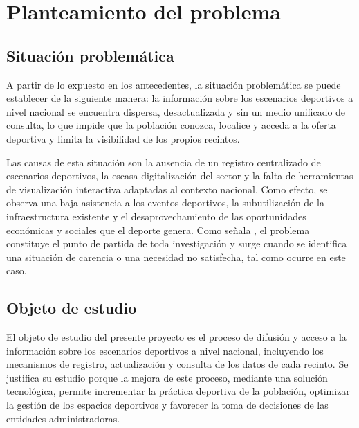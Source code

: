 
\section{Planteamiento del problema}

\subsection{Situaci\'on problem\'atica}

A partir de lo expuesto en los antecedentes, la situaci\'on
problem\'atica se puede establecer de la siguiente manera: la informaci\'on
sobre los escenarios deportivos a nivel nacional se encuentra dispersa,
desactualizada y sin un medio unificado de consulta, lo que impide que la
poblaci\'on conozca, localice y acceda a la oferta deportiva y limita la
visibilidad de los propios recintos.

Las causas de esta situaci\'on son la ausencia de un registro centralizado de
escenarios deportivos, la escasa digitalizaci\'on del sector y la falta de
herramientas de visualizaci\'on interactiva adaptadas al contexto nacional.
Como efecto, se observa una baja asistencia a los eventos deportivos, la
subutilizaci\'on de la infraestructura existente y el desaprovechamiento de
las oportunidades econ\'omicas y sociales que el deporte genera. Como se\~nala
\citet{arias2012}, el problema constituye el punto de partida de toda
investigaci\'on y surge cuando se identifica una situaci\'on de carencia o una
necesidad no satisfecha, tal como ocurre en este caso.

\subsection{Objeto de estudio}

El objeto de estudio del presente proyecto es el proceso de difusi\'on
y acceso a la informaci\'on sobre los escenarios deportivos a nivel
nacional, incluyendo los mecanismos de registro, actualizaci\'on y consulta
de los datos de cada recinto. Se justifica su estudio porque la mejora de
este proceso, mediante una soluci\'on tecnol\'ogica, permite incrementar la
pr\'actica deportiva de la poblaci\'on, optimizar la gesti\'on de los espacios
deportivos y favorecer la toma de decisiones de las entidades
administradoras.

